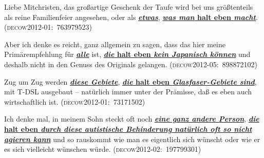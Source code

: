 \begin{exe}
	\ex\label{748} 
		\begin{xlist}	
		\ex\label{748a} 
	
		Liebe Mitchristen, das großartige Geschenk der Taufe wird bei uns größtenteils
		als reine Familienfeier angesehen, oder als \ul{\textbf{\textit{etwas}}}, \ul{\textbf{\textit{was man} halt eben \textit{macht}}}. 
	 	\hfill\hbox{\scshape(decow2012-01: 763979523)}
	 	\newline
	 	\hbox{}\hfill\hbox{\citet[168]{Mueller2016a}}
	 	\ex\label{748b} 
	 
	 	Aber ich denke es reicht, ganz allgemein zu sagen, dass das hier meine Primärempfehlung für \ul{\textbf{\textit{alle}}} ist, \ul{\textbf{\textit{die} halt eben \textit{kein Japanisch können}}} und deshalb nicht in den Genuss des Originals gelangen.                                                                      
		\newline\hbox{}\hfill\hbox{\scshape(decow2012-05: 898872102)}
		\end{xlist}
\end{exe}

\begin{exe}
	\ex\label{749} 
		\begin{xlist}	
		\ex\label{749a} 
	
		Zug um Zug werden \ul{\textbf{\textit{diese Gebiete}}}, \ul{\textbf{\textit{die} halt eben \textit{Glasfaser-Gebiete sind}}}, mit T-DSL ausgebaut – natürlich immer unter der Prämisse, daß es eben auch wirtschaftlich ist.
	 	\hbox{}\hfill\hbox{\scshape(decow2012-01: 73171502)}
	 	\newline
	 	\hbox{}\hfill\hbox{\citet[168]{Mueller2016a}}
	 	\ex\label{749b} 
	 
	 	Ich denke mal, in meinem Sohn steckt oft noch \ul{\textbf{\textit{eine ganz andere Person}}},  \ul{\textbf{\textit{die} halt eben \textit{durch diese autistische Behinderung natürlich oft so nicht agieren kann}}} und so rauskommt wie man es eigentlich sich wünscht oder wie er es sich vielleicht wünschen würde. 
		\newline		
	 	\hbox{}\hfill\hbox{\scshape(decow2012-02: 197799301)}
		\end{xlist}
\end{exe}

